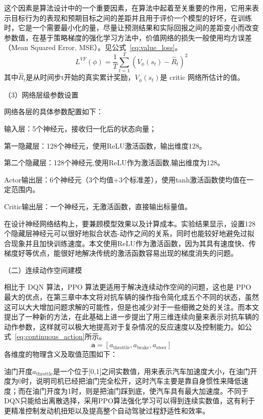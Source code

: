 这个因素是算法设计中的一个重要因素，在算法中起着至关重要的作用，它用来表示目标行为的表现和预期目标之间的差距并且用于评价一个模型的好坏，在训练时，它是一个需要最小化的量，尽量让预测结果和实际回报之间的差距变小而改变参数值，在基于策略梯度的强化学习方法中，价值网络的损失一般使用均方误差（Mean Squared Error, MSE）。见公式~\ref{eq:value_loss}。
\begin{equation}
L^{VF}(\phi) = \frac{1}{T} \sum_{t=1}^{T} \left( V_\phi(s_t) - \hat{R}_t \right)^2
\label{eq:value_loss}
\end{equation}
其中$\hat{R}_t$是从时间步t开始的真实累计奖励，$V_\phi(s_t)$是 critic 网络所估计的值。

（3）网络层级参数设置

网络各层的具体参数配置如下：

输入层：5个神经元，接收归一化后的状态向量；

第一隐藏层：128个神经元，使用ReLU激活函数，输出维度128。

第二个隐藏层：128个神经元,使用ReLU作为激活函数,输出维度为128。

Actor输出层：6个神经元（3个均值+3个标准差），使用tanh激活函数使均值在一定范围内。

Critic输出层：一个神经元，无激活函数，直接输出标量值。

在设计神经网络结构上，要兼顾模型效果以及计算成本。实验结果显示，设置128个隐藏层神经元可以很好地拟合状态-动作之间的关系，同时也能较好地避免过拟合现象并且加快训练速度。本文使用ReLU作为激活函数，因为其具有速度快、传梯度好等优点，能很好地解决传统的激活函数容易出现的梯度消失的问题。

（二）连续动作空间建模

相比于 DQN 算法，PPO 算法更适用于解决连续动作空间的问题，这也是 PPO 最大的优点，在第三章中本文将对抗车辆的操作指令简化成五个不同的状态，虽然这可以大大增加问题求解的可能性，但是也减少对于一些细微之处的关注。而本文提出了一种新的方法，在此基础上进一步提出了用三维连续向量来表示对抗车辆的动作参数，这样就可以极大地提高对于复杂情况的反应速度以及控制能力。如公式~\ref{eq:continuous_action}所示。
\begin{equation}
\mathbf{a} = \left[ a_{\text{throttle}}, a_{\text{brake}}, a_{\text{steer}} \right]
\label{eq:continuous_action}
\end{equation}
各维度的物理含义及取值范围如下：

油门开度$a_{\text{throttle}}$是一个位于[0,1]之间实数值，用来表示汽车加速度大小，在油门开度为0时，说明司机已经把油门完全松开，这时汽车主要是靠自身惯性来降低速度；而在油门开度为1时，则是把油门踩到底，使汽车具有最大加速度。不同于DQN只能给出离散选择，采用PPO算法强化学习可以得到连续实数值，这有利于更精准控制发动机扭矩以及提高整个自动驾驶过程舒适性和效率。

